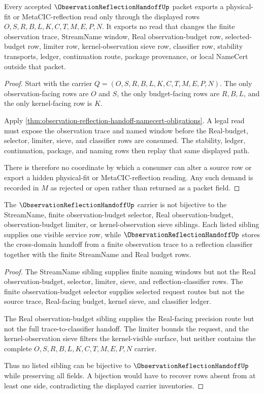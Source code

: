 \begin{theorem}
\label{thm:observation-reflection-handoff-nonescape}
Every accepted $\ObservationReflectionHandoffUp$ packet exports a physical-fit or MetaCIC-reflection read only through the displayed rows $O,S,R,B,L,K,C,T,M,E,P,N$. It exports no read that changes the finite observation trace, StreamName window, Real observation-budget row, selected-budget row, limiter row, kernel-observation sieve row, classifier row, stability transports, ledger, continuation route, package provenance, or local NameCert outside that packet.
\end{theorem}
\begin{proof}
Start with the carrier $Q=(O,S,R,B,L,K,C,T,M,E,P,N)$. The only observation-facing rows are $O$ and $S$, the only budget-facing rows are $R,B,L$, and the only kernel-facing row is $K$.

Apply \autoref{thm:observation-reflection-handoff-namecert-obligations}. A legal read must expose the observation trace and named window before the Real-budget, selector, limiter, sieve, and classifier rows are consumed. The stability, ledger, continuation, package, and naming rows then replay that same displayed path.

There is therefore no coordinate by which a consumer can alter a source row or export a hidden physical-fit or MetaCIC-reflection reading. Any such demand is recorded in $M$ as rejected or open rather than returned as a packet field.
\end{proof}

\begin{theorem}
\label{thm:observation-reflection-handoff-independence-boundary}
The $\ObservationReflectionHandoffUp$ carrier is not bijective to the StreamName, finite observation-budget selector, Real observation-budget, observation-budget limiter, or kernel-observation sieve siblings. Each listed sibling supplies one visible service row, while $\ObservationReflectionHandoffUp$ stores the cross-domain handoff from a finite observation trace to a reflection classifier together with the finite StreamName and Real budget rows.
\end{theorem}
\begin{proof}
The StreamName sibling supplies finite naming windows but not the Real observation-budget, selector, limiter, sieve, and reflection-classifier rows. The finite observation-budget selector supplies selected request routes but not the source trace, Real-facing budget, kernel sieve, and classifier ledger.

The Real observation-budget sibling supplies the Real-facing precision route but not the full trace-to-classifier handoff. The limiter bounds the request, and the kernel-observation sieve filters the kernel-visible surface, but neither contains the complete $O,S,R,B,L,K,C,T,M,E,P,N$ carrier.

Thus no listed sibling can be bijective to $\ObservationReflectionHandoffUp$ while preserving all fields. A bijection would have to recover rows absent from at least one side, contradicting the displayed carrier inventories.
\end{proof}


